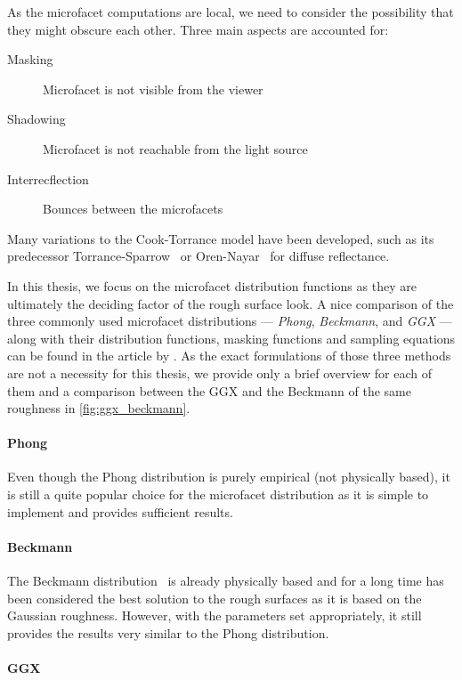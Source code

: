 As the microfacet computations are local, we need to consider the possibility that they might obscure each other. Three main aspects are accounted for:
\begin{description}
	\item[Masking] Microfacet is not visible from the viewer
	\item[Shadowing] Microfacet is not reachable from the light source
	\item[Interrecflection] Bounces between the microfacets
\end{description}

Many variations to the Cook-Torrance model have been developed, such as its predecessor Torrance-Sparrow~\cite{Torrance1967TheoryFO} or Oren-Nayar~\cite{oren1994generalization} for diffuse reflectance.

In this thesis, we focus on the microfacet distribution functions as they are ultimately the deciding factor of the rough surface look. A nice comparison of the three commonly used microfacet distributions --- \emph{Phong}, \emph{Beckmann}, and \emph{GGX} --- along with their distribution functions, masking functions and sampling equations can be found in the article by \citet{walter2007microfacet}. As the exact formulations of those three methods are not a necessity for this thesis, we provide only a brief overview for each of them and a comparison between the GGX and the Beckmann of the same roughness in 
\autoref{fig:ggx_beckmann}.

\paragraph{Phong}

Even though the Phong distribution is purely empirical (not physically based), it is still a quite popular choice for the microfacet distribution as it is simple to implement and provides sufficient results.

\paragraph{Beckmann}

The Beckmann distribution~\cite{beckmann1987scattering} is already physically based and for a long time has been considered the best solution to the rough surfaces as it is based on the Gaussian roughness. However, with the parameters set appropriately, it still provides the results very similar to the Phong distribution.

\paragraph{GGX}

